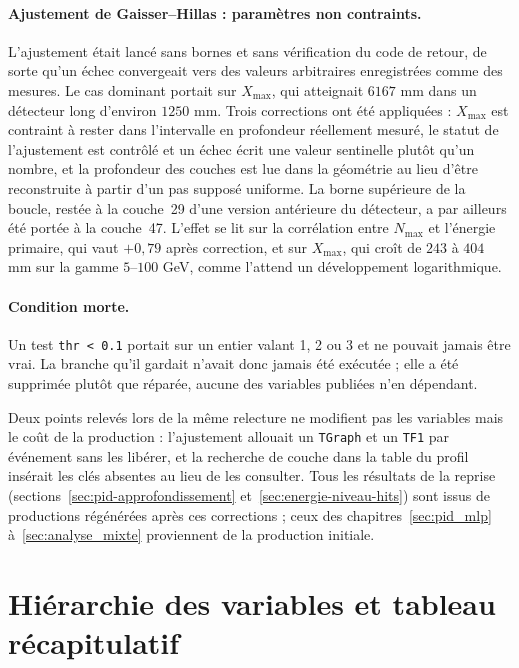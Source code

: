 \paragraph{Ajustement de Gaisser--Hillas : paramètres non contraints.} L'ajustement était lancé sans bornes et sans vérification du code de retour, de sorte qu'un échec convergeait vers des valeurs arbitraires enregistrées comme des mesures. Le cas dominant portait sur \(X_{\max}\), qui atteignait \(6167\) mm dans un détecteur long d'environ \(1250\) mm. Trois corrections ont été appliquées : \(X_{\max}\) est contraint à rester dans l'intervalle en profondeur réellement mesuré, le statut de l'ajustement est contrôlé et un échec écrit une valeur sentinelle plutôt qu'un nombre, et la profondeur des couches est lue dans la géométrie au lieu d'être reconstruite à partir d'un pas supposé uniforme. La borne supérieure de la boucle, restée à la couche~29 d'une version antérieure du détecteur, a par ailleurs été portée à la couche~47. L'effet se lit sur la corrélation entre \(N_{\max}\) et l'énergie primaire, qui vaut \(+0{,}79\) après correction, et sur \(X_{\max}\), qui croît de \(243\) à \(404\) mm sur la gamme \(5\)--\(100\) GeV, comme l'attend un développement logarithmique.

\paragraph{Condition morte.} Un test \texttt{thr < 0.1} portait sur un entier valant 1, 2 ou 3 et ne pouvait jamais être vrai. La branche qu'il gardait n'avait donc jamais été exécutée ; elle a été supprimée plutôt que réparée, aucune des variables publiées n'en dépendant.

Deux points relevés lors de la même relecture ne modifient pas les variables mais le coût de la production : l'ajustement allouait un \texttt{TGraph} et un \texttt{TF1} par événement sans les libérer, et la recherche de couche dans la table du profil insérait les clés absentes au lieu de les consulter. Tous les résultats de la reprise (sections~\ref{sec:pid-approfondissement} et~\ref{sec:energie-niveau-hits}) sont issus de productions régénérées après ces corrections ; ceux des chapitres~\ref{sec:pid_mlp} à~\ref{sec:analyse_mixte} proviennent de la production initiale.

\section{Hiérarchie des variables et tableau récapitulatif}
\label{annexe:synthesevars}

